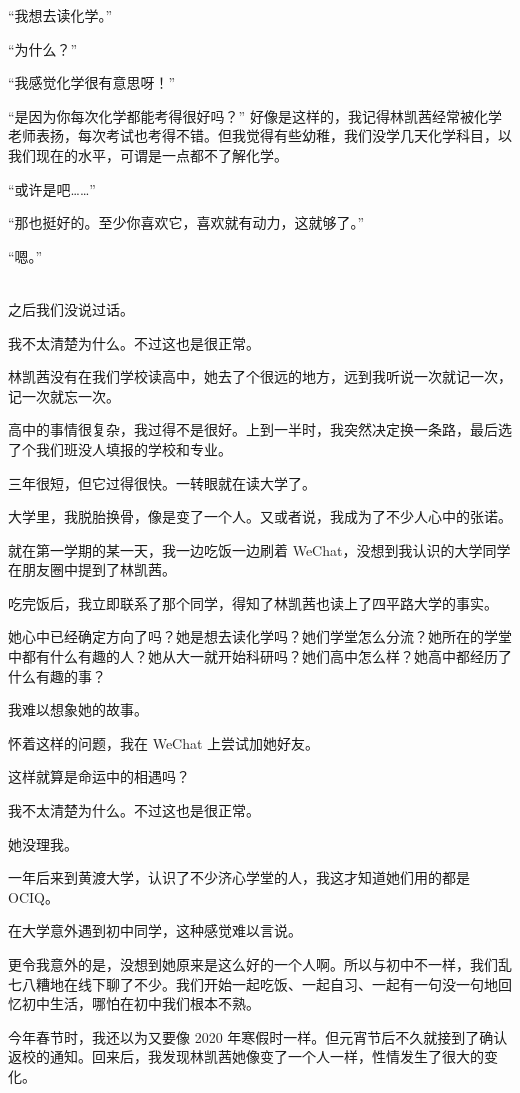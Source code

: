 \documentclass[UTF8]{ctexart}
\begin{document}
“我想去读化学。”

“为什么？”

“我感觉化学很有意思呀！”

“是因为你每次化学都能考得很好吗？” 好像是这样的，我记得林凯茜经常被化学老师表扬，每次考试也考得不错。但我觉得有些幼稚，我们没学几天化学科目，以我们现在的水平，可谓是一点都不了解化学。

“或许是吧……”

“那也挺好的。至少你喜欢它，喜欢就有动力，这就够了。”

“嗯。”

~\\

之后我们没说过话。

我不太清楚为什么。不过这也是很正常。

林凯茜没有在我们学校读高中，她去了个很远的地方，远到我听说一次就记一次，记一次就忘一次。

高中的事情很复杂，我过得不是很好。上到一半时，我突然决定换一条路，最后选了个我们班没人填报的学校和专业。

三年很短，但它过得很快。一转眼就在读大学了。

大学里，我脱胎换骨，像是变了一个人。又或者说，我成为了不少人心中的张诺。

就在第一学期的某一天，我一边吃饭一边刷着 WeChat，没想到我认识的大学同学在朋友圈中提到了林凯茜。

吃完饭后，我立即联系了那个同学，得知了林凯茜也读上了四平路大学的事实。

她心中已经确定方向了吗？她是想去读化学吗？她们学堂怎么分流？她所在的学堂中都有什么有趣的人？她从大一就开始科研吗？她们高中怎么样？她高中都经历了什么有趣的事？

我难以想象她的故事。

怀着这样的问题，我在 WeChat 上尝试加她好友。

这样就算是命运中的相遇吗？

我不太清楚为什么。不过这也是很正常。

她没理我。

一年后来到黄渡大学，认识了不少济心学堂的人，我这才知道她们用的都是 OCIQ。

在大学意外遇到初中同学，这种感觉难以言说。

更令我意外的是，没想到她原来是这么好的一个人啊。所以与初中不一样，我们乱七八糟地在线下聊了不少。我们开始一起吃饭、一起自习、一起有一句没一句地回忆初中生活，哪怕在初中我们根本不熟。

今年春节时，我还以为又要像 2020 年寒假时一样。但元宵节后不久就接到了确认返校的通知。回来后，我发现林凯茜她像变了一个人一样，性情发生了很大的变化。
\end{document}
